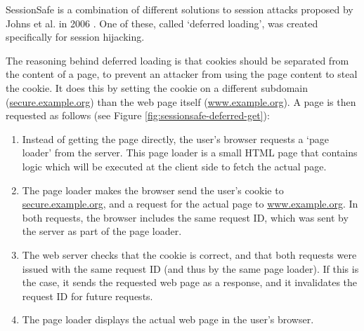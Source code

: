 SessionSafe is a combination of different solutions to session attacks proposed by Johns et al. in 2006 \cite{Johns2006}. One of these, called `deferred loading', was created specifically for session hijacking.

The reasoning behind deferred loading is that cookies should be separated from the content of a page, to prevent an attacker from using the page content to steal the cookie. It does this by setting the cookie on a different subdomain (\url{secure.example.org}) than the web page itself (\url{www.example.org}). A page is then requested as follows (see Figure \ref{fig:sessionsafe-deferred-get}):
\begin{enumerate}
	\item Instead of getting the page directly, the user's browser requests a `page loader' from the server. This page loader is a small HTML page that contains logic which will be executed at the client side to fetch the actual page.
	\item The page loader makes the browser send the user's cookie to \url{secure.example.org}, and a request for the actual page to \url{www.example.org}. In both requests, the browser includes the same request ID, which was sent by the server as part of the page loader.
	\item The web server checks that the cookie is correct, and that both requests were issued with the same request ID (and thus by the same page loader). If this is the case, it sends the requested web page as a response, and it invalidates the request ID for future requests.
	\item The page loader displays the actual web page in the user's browser.
\end{enumerate}

